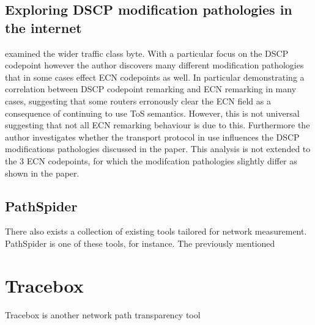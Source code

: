 \documentclass{l4proj}
\begin{document}
\subsection{Exploring DSCP modification pathologies in the internet}

\cite{custura_exploring_2017} examined the wider traffic class byte. With a particular focus on the DSCP codepoint however the author discovers many different modification pathologies that in some cases effect ECN codepoints as well. In particular demonstrating a correlation between DSCP codepoint remarking and ECN remarking in many cases, suggesting that some routers erronously clear the ECN field as a consequence of continuing to use ToS semantics. However, this is not universal suggesting that not all ECN remarking behaviour is due to this. Furthermore the author investigates whether the transport protocol in use influences the DSCP modifications pathologies discussed in the paper. This analysis is not extended to the 3 ECN codepoints, for which the modifcation pathologies slightly differ as shown in the paper.

\subsection{PathSpider}

There also exists a collection of existing tools tailored for network measurement. PathSpider is one of these tools, for instance. The previously mentioned

\section{Tracebox}

Tracebox is another network path transparency tool






\end{document}
